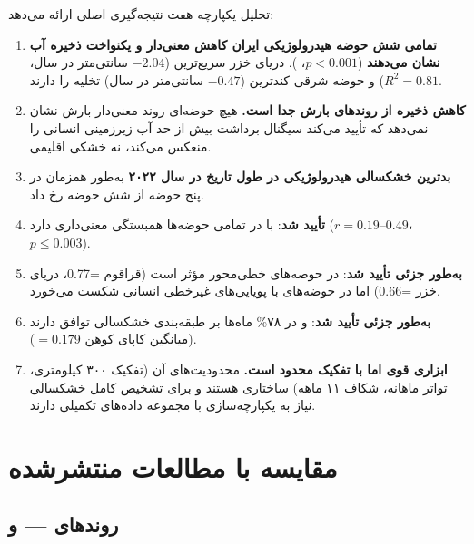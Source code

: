 \documentclass[12pt, a4paper]{article}
\begin{document}
تحلیل یکپارچه هفت نتیجه‌گیری اصلی ارائه می‌دهد:

\begin{enumerate}
  \item \textbf{تمامی شش حوضه هیدرولوژیکی ایران کاهش معنی‌دار و یکنواخت ذخیره آب
        نشان می‌دهند} ($p < 0.001$، ). دریای خزر سریع‌ترین ($-2.04$
        سانتی‌متر در سال، $R^2=0.81$) و حوضه شرقی کندترین ($-0.47$ سانتی‌متر در سال)
        تخلیه را دارند.

  \item \textbf{کاهش ذخیره از روندهای بارش جدا است.} هیچ حوضه‌ای روند معنی‌دار بارش
         نشان نمی‌دهد که تأیید می‌کند سیگنال  برداشت بیش از حد
        آب زیرزمینی انسانی را منعکس می‌کند، نه خشکی اقلیمی.

  \item \textbf{بدترین خشکسالی هیدرولوژیکی در طول تاریخ در سال ۲۰۲۲} به‌طور همزمان
        در پنج حوضه از شش حوضه رخ داد.

  \item \textbf{ تأیید شد}:  با  در تمامی حوضه‌ها
        همبستگی معنی‌داری دارد ($r = 0.19$–$0.49$، $p \leq 0.003$).

  \item \textbf{ به‌طور جزئی تأیید شد}:  در حوضه‌های
        خطی‌محور مؤثر است (قراقوم =0.77، دریای خزر =0.66) اما در
        حوضه‌های با پویایی‌های غیرخطی انسانی شکست می‌خورد.

  \item \textbf{ به‌طور جزئی تأیید شد}:  و  در ۷۸\% ماه‌ها
        بر طبقه‌بندی خشکسالی توافق دارند (میانگین کاپای کوهن $= 0.179$).

  \item \textbf{ ابزاری قوی اما با تفکیک محدود است.} محدودیت‌های آن
        (تفکیک ۳۰۰ کیلومتری، تواتر ماهانه، شکاف ۱۱ ماهه) ساختاری هستند و برای
        تشخیص کامل خشکسالی نیاز به یکپارچه‌سازی با مجموعه داده‌های تکمیلی دارند.
\end{enumerate}

\section{مقایسه با مطالعات منتشرشده}
\label{sec:4-8}

\subsection{روندهای  —  و }
\label{sec:4-8-1}
\end{document}
